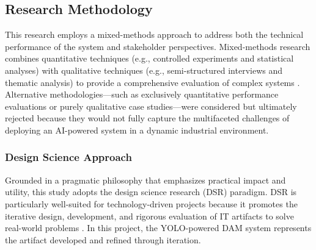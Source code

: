 \documentclass[a4paper,10pt,twocolumn]{article}
\numberwithin{figure}{section}
\numberwithin{table}{section}
\begin{document}
\subsection{Research Methodology}
This research employs a mixed-methods approach to address both the 
technical performance of the system and stakeholder perspectives. 
Mixed-methods research combines quantitative techniques 
(e.g., controlled experiments and statistical analyses) with 
qualitative techniques (e.g., semi-structured interviews and thematic analysis)
to provide a comprehensive evaluation of complex systems \citep{johnson2004mixed}.
\vspace{0.3cm} Alternative methodologies—such as exclusively quantitative performance evaluations 
or purely qualitative case studies—were considered but ultimately rejected because 
they would not fully capture the multifaceted challenges of deploying an AI-powered 
system in a dynamic industrial environment.

\vspace{0.3cm}
\subsubsection{Design Science Approach}
\vspace{0.3cm}


Grounded in a pragmatic philosophy that emphasizes practical impact and utility, 
this study adopts the design science research (DSR) paradigm. DSR is particularly 
well-suited for technology-driven projects because it promotes the iterative design, 
development, and rigorous evaluation of IT artifacts to solve 
real-world problems \citep{hevner2004design}. In this project, 
the YOLO-powered DAM system represents 
the artifact developed and refined through iteration.

\vspace{0.3cm}
\end{document}
